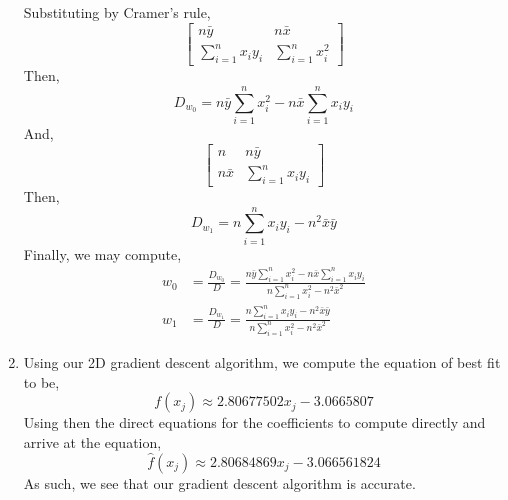 \documentclass[letterpaper,10pt]{article}
\newcommand{\sxy}{\sum_{i=1}^nx_iy_i}
\begin{document}
\begin{enumerate}
Substituting by Cramer's rule,
\[\begin{bmatrix}
n\bar{y} & n\bar{x} \\
\sxy & \sum_{i=1}^n x_i^2
\end{bmatrix}\]
Then,
\[D_{w_0}=n\bar{y}\sum_{i=1}^n x_i^2-n\bar{x}\sxy\]
And,
\[\begin{bmatrix}
n & n\bar{y} \\
n\bar{x} & \sxy
\end{bmatrix}\]
Then,
\[D_{w_1}=n\sxy -n^2\bar{x}\bar{y}\]
Finally, we may compute,
\begin{align*}
w_0 &= \frac{D_{w_0}}{D}=\frac{n\bar{y}\sum_{i=1}^n x_i^2-n\bar{x}\sxy}{n\sum_{i=1}^n x_i^2-n^2\bar{x}^2}\\
w_1 &= \frac{D_{w_1}}{D}=\frac{n\sxy -n^2\bar{x}\bar{y}}{n\sum_{i=1}^n x_i^2-n^2\bar{x}^2}
\end{align*}
\item Using our 2D gradient descent algorithm, we compute the equation of best fit to be,
\[f(x_j) \approx 2.80677502x_j-3.0665807\]
Using then the direct equations for the coefficients to compute directly and arrive at the equation,
\[\hat{f}(x_j)\approx 2.80684869x_j-3.066561824\]
As such, we see that our gradient descent algorithm is accurate.
\end{enumerate}
\end{document}
